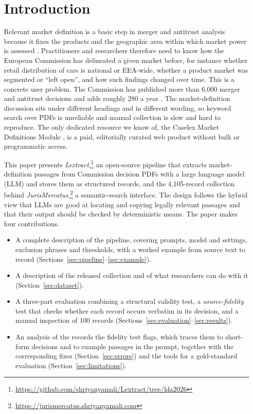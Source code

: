 \documentclass{IOS-Book-Article}
\begin{document}
\section{Introduction}
\label{sec:introduction}

Relevant market definition is a basic step in merger and antitrust analysis
because it fixes the products and the geographic area within which market power
is assessed \cite{marketnotice2024}. Practitioners and researchers therefore
need to know how the European Commission has delineated a given market before,
for instance whether retail distribution of cars is national or EEA-wide,
whether a product market was segmented or ``left open'', and how such findings
changed over time. This is a concrete user problem. The Commission has
published more than 6,000 merger and antitrust decisions \cite{bldr2024} and
adds roughly 280 a year \cite{apdtsf2021}. The market-definition discussion sits
under different headings and in different wording, so keyword search over PDFs
is unreliable and manual collection is slow and hard to reproduce. The only
dedicated resource we know of, the Caselex Market Definitions Module
\cite{caselex}, is a paid, editorially curated web product without bulk or
programmatic access.

This paper presents \emph{Lextract},\footnote{\url{https://github.com/shriyanyamali/Lextract/tree/lda2026}}
an open-source pipeline that extracts market-definition passages from
Commission decision PDFs with a large language model (LLM) and stores them as
structured records, and the 4,105-record collection behind
\emph{JurisMercatus},\footnote{\url{https://jurismercatus.shriyanyamali.com}} a
semantic-search interface. The design follows the hybrid view that LLMs are
good at locating and copying legally relevant passages and that their output
should be checked by deterministic means. The paper makes four contributions.
\begin{itemize}
  \item A complete description of the pipeline, covering prompts, model and
        settings, exclusion phrases and thresholds, with a worked example from
        source text to record (Sections~\ref{sec:pipeline}--\ref{sec:example}).
  \item A description of the released collection and of what researchers can
        do with it (Section~\ref{sec:dataset}).
  \item A three-part evaluation combining a structural validity test, a
        \emph{source-fidelity} test that checks whether each record occurs
        verbatim in its decision, and a manual inspection of 100 records
        (Sections~\ref{sec:evaluation}--\ref{sec:results}).
  \item An analysis of the records the fidelity test flags, which traces them
        to short-form decisions and to example passages in the prompt, together
        with the corresponding fixes (Section~\ref{sec:errors}) and the tools
        for a gold-standard evaluation (Section~\ref{sec:limitations}).
\end{itemize}
\end{document}
